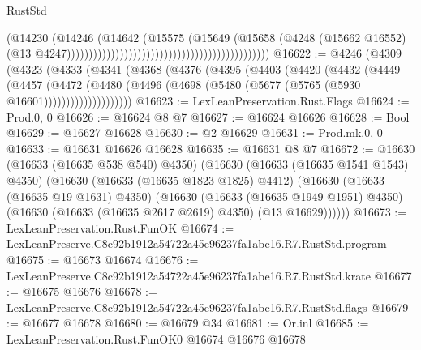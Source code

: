 \begin{lexlean}{RustStd}
\begin{coremodule}
                                                                                (@14230
                                                                                  (@14246
                                                                                    (@14642
                                                                                      (@15575
                                                                                        (@15649
                                                                                          (@15658
                                                                                            (@4248
                                                                                              (@15662
                                                                                                @16552)
                                                                                              (@13
                                                                                                @4247))))))))))))))))))))))))))))))))))))))))))))))
@16622 := @4246
    (@4309
      (@4323
        (@4333
          (@4341
            (@4368
              (@4376
                (@4395
                  (@4403
                    (@4420
                      (@4432
                        (@4449
                          (@4457
                            (@4472
                              (@4480
                                (@4496 (@4698 (@5480 (@5677 (@5765 (@5930 @16601))))))))))))))))))))
@16623 := LexLeanPreservation.Rust.Flags
@16624 := Prod.{0, 0}
@16626 := @16624 @8 @7
@16627 := @16624 @16626
@16628 := Bool
@16629 := @16627 @16628
@16630 := @2 @16629
@16631 := Prod.mk.{0, 0}
@16633 := @16631 @16626 @16628
@16635 := @16631 @8 @7
@16672 := @16630
    (@16633 (@16635 @538 @540) @4350)
    (@16630
      (@16633 (@16635 @1541 @1543) @4350)
      (@16630
        (@16633 (@16635 @1823 @1825) @4412)
        (@16630
          (@16633 (@16635 @19 @1631) @4350)
          (@16630
            (@16633 (@16635 @1949 @1951) @4350)
            (@16630 (@16633 (@16635 @2617 @2619) @4350) (@13 @16629))))))
@16673 := LexLeanPreservation.Rust.FunOK
@16674 := LexLeanPreserve.C8c92b1912a54722a45e96237fa1abe16.R7.RustStd.program
@16675 := @16673 @16674
@16676 := LexLeanPreserve.C8c92b1912a54722a45e96237fa1abe16.R7.RustStd.krate
@16677 := @16675 @16676
@16678 := LexLeanPreserve.C8c92b1912a54722a45e96237fa1abe16.R7.RustStd.flags
@16679 := @16677 @16678
@16680 := @16679 @34
@16681 := Or.inl
@16685 := LexLeanPreservation.Rust.FunOK0 @16674 @16676 @16678

\end{coremodule}
\end{lexlean}
